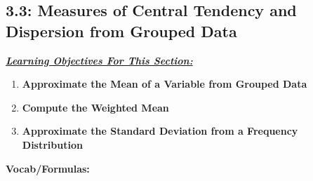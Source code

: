 \documentclass{report}
\begin{document}
         \subsection{3.3: Measures of Central Tendency and Dispersion from Grouped Data}
         \bigbreak \noindent 
         \textbf{\textit{\underline{Learning Objectives For This Section:}}}
         \begin{enumerate}
             \item \textbf{Approximate the Mean of a Variable from Grouped Data}
             \item \textbf{Compute the Weighted Mean}
             \item \textbf{Approximate the Standard Deviation from a Frequency Distribution}
         \end{enumerate}
         \bigbreak \noindent 
         \textbf{Vocab/Formulas:}
\end{document}
